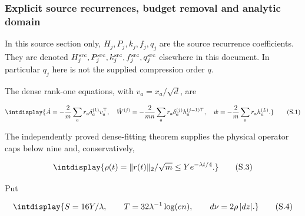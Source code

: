 \subsubsection{Explicit source recurrences, budget removal and analytic domain}
\label{int:source-explicit-recurrences}


In this source section only, \(H_j,\allowbreak P_j,\allowbreak k_j,\allowbreak f_j,\allowbreak q_j\) are the source recurrence coefficients. They are denoted \(H_j^{\rm src},\allowbreak P_j^{\rm src},\allowbreak  k_j^{\rm src},\allowbreak f_j^{\rm src},\allowbreak q_j^{\rm src}\) elsewhere in this document. In particular \(q_j\) here is not the supplied compression order \(q\).



The dense rank-one equations, with \(v_a=x_a/\sqrt d\), are


\begingroup\renewcommand{\theHequation}{intdisplay.363}
\begin{equation}
\intdisplay{
\dot A=-\frac2m\sum_a r_a\delta_a^{(1)}v_a^\top,\quad
\dot W^{(j)}=-\frac2{mn}\sum_a r_a\delta_a^{(j)}
                         h_a^{(j-1)\top},\quad
\dot w=-\frac2m\sum_a r_ah_a^{(L)}.
}
\tag{S.1}
\label{int:eq-0176-s-1}
\end{equation}
\endgroup


The independently proved dense-fitting theorem supplies the physical operator caps below nine and, conservatively,


\begingroup\renewcommand{\theHequation}{intdisplay.364}
\begin{equation}
\intdisplay{
\rho(t)=\|r(t)\|_2/\sqrt m\le Ye^{-\lambda t/4}.
}
\tag{S.3}
\label{int:eq-0177-s-3}
\end{equation}
\endgroup


Put


\begingroup\renewcommand{\theHequation}{intdisplay.365}
\begin{equation}
\intdisplay{
S=16Y/\lambda,\qquad
T=32\lambda^{-1}\log(en),\qquad d\nu=2\rho\,|dz|.
}
\tag{S.4}
\label{int:eq-0178-s-4}
\end{equation}
\endgroup


